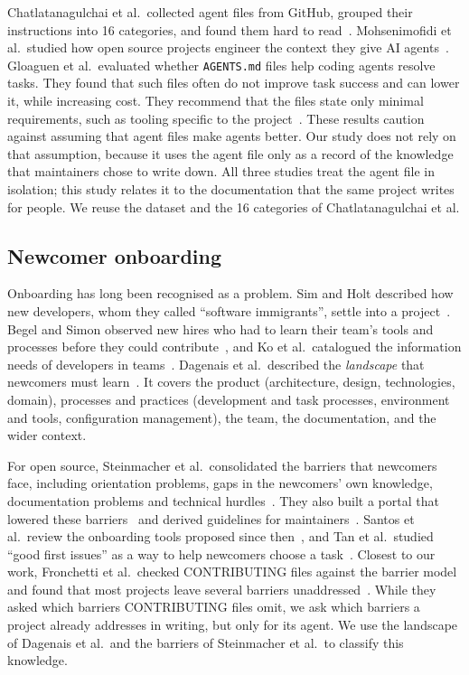 \documentclass[sigconf,nonacm]{acmart}
\begin{document}
Chatlatanagulchai et al.\ collected \nPackageFiles{} agent files
from GitHub, grouped their instructions into 16 categories, and found them hard to
read~\cite{chatlatanagulchai2026agentreadmes}. Mohsenimofidi et al.\ studied how open source
projects engineer the context they give AI agents~\cite{mohsenimofidi2026context}. Gloaguen et al.\
evaluated whether \texttt{AGENTS.md} files help coding agents resolve tasks. They found that such
files often do not improve task success and can lower it, while increasing cost. They recommend that
the files state only minimal requirements, such as tooling specific to the
project~\cite{gloaguen2026agentsmd}. These results caution against assuming that agent files make
agents better. Our study does not rely on that assumption, because it uses the agent file only as a
record of the knowledge that maintainers chose to write down. All three studies treat the agent
file in isolation; this study relates it to the documentation that the same project writes for
people. We reuse the dataset and the 16 categories of Chatlatanagulchai et al.

\subsection{Newcomer onboarding}

Onboarding has long been recognised as a problem. Sim and Holt described how new developers, whom
they called ``software immigrants'', settle into a project~\cite{sim1998rampup}. Begel and Simon
observed new hires who had to learn their team's tools and processes before they could
contribute~\cite{begel2008novice}, and Ko et al.\ catalogued the information needs of developers in
teams~\cite{ko2007information}. Dagenais et al.\ described the \emph{landscape} that newcomers must
learn~\cite{dagenais2010landscape}. It covers the product (architecture, design, technologies,
domain), processes and practices (development and task processes, environment and tools,
configuration management), the team, the documentation, and the wider context.

For open source, Steinmacher et al.\ consolidated the barriers that newcomers face, including
orientation problems, gaps in the newcomers' own knowledge, documentation problems and technical
hurdles~\cite{steinmacher2015barriers,steinmacher2015social}. They also built a portal that lowered
these barriers~\cite{steinmacher2016portal} and derived guidelines for
maintainers~\cite{steinmacher2019letmein}. Santos et al.\ review the onboarding tools proposed since
then~\cite{santos2024onboarding}, and Tan et al.\ studied ``good first issues'' as a way to help
newcomers choose a task~\cite{tan2020goodfirst}. Closest to our work, Fronchetti et al.\ checked
CONTRIBUTING files against the barrier model and found that most projects leave several barriers
unaddressed~\cite{fronchetti2023contributing}. While they asked which barriers CONTRIBUTING files
omit, we ask which barriers a project already addresses in writing, but only for its agent. We use
the landscape of Dagenais et al.\ and the barriers of Steinmacher et al.\ to classify this
knowledge.
\end{document}
